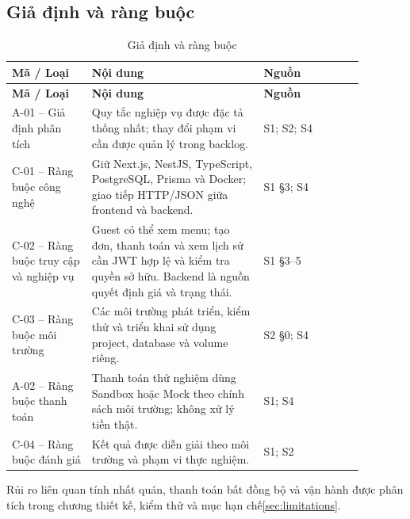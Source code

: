 \subsection{Giả định và ràng buộc}

\begingroup\small
\renewcommand{\arraystretch}{1.2}
\begin{longtable}{>{\raggedright\arraybackslash}p{0.20\linewidth}>{\raggedright\arraybackslash}p{0.43\linewidth}>{\raggedright\arraybackslash}p{0.25\linewidth}}
\caption{Giả định và ràng buộc}\label{tab:auto-context-and-scope-7}\\
\hline
\textbf{Mã / Loại} & \textbf{Nội dung} & \textbf{Nguồn} \\ \hline
\endfirsthead
\textbf{Mã / Loại} & \textbf{Nội dung} & \textbf{Nguồn} \\ \hline
\endhead
A-01 -- Giả định phân tích & Quy tắc nghiệp vụ được đặc tả thống nhất; thay đổi phạm vi cần được quản lý trong backlog. & S1; S2; S4 \\ \hline
C-01 -- Ràng buộc công nghệ & Giữ Next.js, NestJS, TypeScript, PostgreSQL, Prisma và Docker; giao tiếp HTTP/JSON giữa frontend và backend. & S1 §3; S4 \\ \hline
C-02 -- Ràng buộc truy cập và nghiệp vụ & Guest có thể xem menu; tạo đơn, thanh toán và xem lịch sử cần JWT hợp lệ và kiểm tra quyền sở hữu. Backend là nguồn quyết định giá và trạng thái. & S1 §3--5 \\ \hline
C-03 -- Ràng buộc môi trường & Các môi trường phát triển, kiểm thử và triển khai sử dụng project, database và volume riêng. & S2 §0; S4 \\ \hline
A-02 -- Ràng buộc thanh toán & Thanh toán thử nghiệm dùng Sandbox hoặc Mock theo chính sách môi trường; không xử lý tiền thật. & S1; S4 \\ \hline
C-04 -- Ràng buộc đánh giá & Kết quả được diễn giải theo môi trường và phạm vi thực nghiệm. & S1; S2 \\ \hline
\end{longtable}
\endgroup

Rủi ro liên quan tính nhất quán, thanh toán bất đồng bộ và vận hành được phân tích trong chương thiết kế, kiểm thử và mục hạn chế\ref{sec:limitations}.
